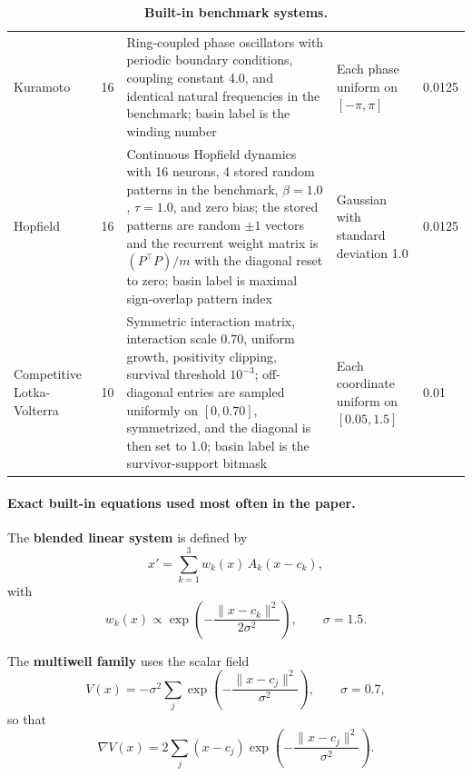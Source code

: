 \begin{table}[ht]
\begin{tabular}{p{}p{}p{}p{}p{}}
Kuramoto & 16 & Ring-coupled phase oscillators with periodic boundary conditions, coupling constant 4.0, and identical natural frequencies in the benchmark; basin label is the winding number & Each phase uniform on $[-\pi, \pi]$ & 0.0125 \\
Hopfield & 16 & Continuous Hopfield dynamics with 16 neurons, 4 stored random patterns in the benchmark, $\beta = 1.0$, $\tau = 1.0$, and zero bias; the stored patterns are random $\pm 1$ vectors and the recurrent weight matrix is $(P^\top P)/m$ with the diagonal reset to zero; basin label is maximal sign-overlap pattern index & Gaussian with standard deviation 1.0 & 0.0125 \\
Competitive Lotka-Volterra & 10 & Symmetric interaction matrix, interaction scale 0.70, uniform growth, positivity clipping, survival threshold $10^{-3}$; off-diagonal entries are sampled uniformly on $[0,0.70]$, symmetrized, and the diagonal is then set to 1.0; basin label is the survivor-support bitmask & Each coordinate uniform on $[0.05,1.5]$ & 0.01 \\
\bottomrule
\end{tabular}
\caption{\textbf{Built-in benchmark systems.}}
\label{tab:review-builtin-systems-20260314}
\end{table}

\paragraph{Exact built-in equations used most often in the paper.}

The \textbf{blended linear system} is defined by
\begin{equation}
x' = \sum_{k=1}^{3} w_k(x)\, A_k (x - c_k),
\end{equation}
with
\begin{equation}
w_k(x) \propto \exp\!\left(-\frac{\|x-c_k\|^2}{2\sigma^2}\right),
\qquad
\sigma = 1.5.
\end{equation}

The \textbf{multiwell family} uses the scalar field
\begin{equation}
V(x) = -\sigma^2 \sum_j \exp\!\left(-\frac{\|x-c_j\|^2}{\sigma^2}\right),
\qquad
\sigma = 0.7,
\end{equation}
so that
\begin{equation}
\nabla V(x) = 2 \sum_j (x-c_j)\exp\!\left(-\frac{\|x-c_j\|^2}{\sigma^2}\right).
\end{equation}

